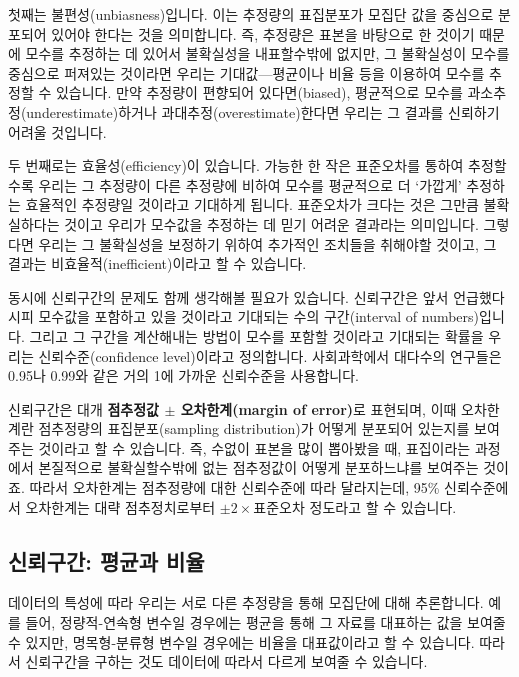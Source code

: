 \documentclass[]{book}
\begin{document}
첫째는 불편성(unbiasness)입니다. 이는 추정량의 표집분포가 모집단 값을 중심으로 분포되어 있어야 한다는 것을 의미합니다. 즉, 추정량은 표본을 바탕으로 한 것이기 때문에 모수를 추정하는 데 있어서 불확실성을 내표할수밖에 없지만, 그 불확실성이 모수를 중심으로 퍼져있는 것이라면 우리는 기대값---평균이나 비율 등을 이용하여 모수를 추정할 수 있습니다. 만약 추정량이 편향되어 있다면(biased), 평균적으로 모수를 과소추정(underestimate)하거나 과대추정(overestimate)한다면 우리는 그 결과를 신뢰하기 어려울 것입니다.

두 번째로는 효율성(efficiency)이 있습니다. 가능한 한 작은 표준오차를 통하여 추정할수록 우리는 그 추정량이 다른 추정량에 비하여 모수를 평균적으로 더 `가깝게' 추정하는 효율적인 추정량일 것이라고 기대하게 됩니다. 표준오차가 크다는 것은 그만큼 불확실하다는 것이고 우리가 모수값을 추정하는 데 믿기 어려운 결과라는 의미입니다. 그렇다면 우리는 그 불확실성을 보정하기 위하여 추가적인 조치들을 취해야할 것이고, 그 결과는 비효율적(inefficient)이라고 할 수 있습니다.

동시에 신뢰구간의 문제도 함께 생각해볼 필요가 있습니다. 신뢰구간은 앞서 언급했다시피 모수값을 포함하고 있을 것이라고 기대되는 수의 구간(interval of numbers)입니다. 그리고 그 구간을 계산해내는 방법이 모수를 포함할 것이라고 기대되는 확률을 우리는 신뢰수준(confidence level)이라고 정의합니다. 사회과학에서 대다수의 연구들은 0.95나 0.99와 같은 거의 1에 가까운 신뢰수준을 사용합니다.

신뢰구간은 대개 \textbf{점추정값 \(\pm\) 오차한계(margin of error)}로 표현되며, 이때 오차한계란 점추정량의 표집분포(sampling distribution)가 어떻게 분포되어 있는지를 보여주는 것이라고 할 수 있습니다. 즉, 수없이 표본을 많이 뽑아봤을 때, 표집이라는 과정에서 본질적으로 불확실할수밖에 없는 점추정값이 어떻게 분포하느냐를 보여주는 것이죠. 따라서 오차한계는 점추정량에 대한 신뢰수준에 따라 달라지는데, 95\% 신뢰수준에서 오차한계는 대략 점추정치로부터 \(\pm 2\times\)표준오차 정도라고 할 수 있습니다.

\hypertarget{uxc2e0uxb8b0uxad6cuxac04-uxd3c9uxade0uxacfc-uxbe44uxc728}{%
\subsection{신뢰구간: 평균과 비율}\label{uxc2e0uxb8b0uxad6cuxac04-uxd3c9uxade0uxacfc-uxbe44uxc728}}

데이터의 특성에 따라 우리는 서로 다른 추정량을 통해 모집단에 대해 추론합니다. 예를 들어, 정량적-연속형 변수일 경우에는 평균을 통해 그 자료를 대표하는 값을 보여줄 수 있지만, 명목형-분류형 변수일 경우에는 비율을 대표값이라고 할 수 있습니다. 따라서 신뢰구간을 구하는 것도 데이터에 따라서 다르게 보여줄 수 있습니다.
\end{document}
